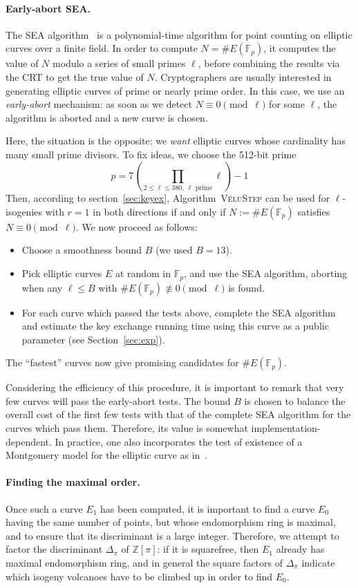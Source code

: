 \documentclass{llncs}
\newcommand{\F}{\mathbb{F}}
\newcommand{\Z}{\mathbb{Z}}
\newcommand{\algstyle}[1]{\textsc{#1}}
\begin{document}
\paragraph{Early-abort SEA.}
The SEA algorithm~\cite{schoof95,Morain95}
is a polynomial-time algorithm for
point counting on elliptic curves over a finite field. In order to compute
$N = \# E(\F_p)$, it computes the value of $N$ modulo a series
of small primes $\ell$, before combining the results via the CRT
to get the true value of $N$.
Cryptographers are usually interested in generating elliptic curves of
prime or nearly prime order. In this case, we use an \emph{early-abort}
mechanism: as soon as we detect $N \equiv 0\pmod{\ell}$ for some $\ell$, the algorithm is aborted
and a new curve is chosen.

Here, the situation is the opposite: we \emph{want} elliptic curves
whose cardinality has many small prime divisors.
To fix ideas, we choose the 512-bit prime
\[
    p = 7 \left(\prod_{2\leq\ell\leq 380,\ \ell \text{ prime}} \ell\right) - 1
\]
Then, according to section~\ref{sec:keyex}, Algorithm~\algstyle{VéluStep} can be used
for $\ell$-isogenies with $r=1$ in both directions if and only if
$N := \# E(\F_p)$ satisfies $N \equiv0\pmod{\ell}$.
We now proceed as follows:
\begin{itemize}
\item Choose a smoothness bound $B$ (we used $B = 13$).
\item Pick elliptic curves $E$ at random in $\F_p$, and use the SEA algorithm,
aborting when any $\ell\leq B$ 
with $\#E(\F_p) \not\equiv 0\pmod{\ell}$ is found.
\item For each curve which passed the tests above, complete the SEA
algorithm and estimate the key exchange running time using this
curve as a public parameter (see Section~\ref{sec:exp}).
\end{itemize}
The ``fastest'' curves now give promising candidates for $\#E(\F_p)$.

Considering the efficiency of this procedure, it is important to remark
that very few curves will pass the early-abort tests. The bound $B$ is
chosen to balance the overall cost of the first few tests with that of
the complete SEA algorithm for the curves which pass them. Therefore,
its value is somewhat implementation-dependent. In practice, one also
incorporates the test of existence of a Montgomery model for the
elliptic curve as in~\cite{OKS00}.

\paragraph{Finding the maximal order.}
Once such a curve $E_1$ has been computed, it is important to find a curve
$E_0$ having the same number of points, but whose endomorphism ring is maximal, and
to ensure that its discriminant is a large integer. Therefore, we attempt to
factor the discriminant $Δ_\pi$ of $\Z[\pi]$: if it is squarefree,
then $E_1$ already has maximal endomorphism ring, and in general the square
factors of $Δ_\pi$ indicate which isogeny volcanoes have to be climbed up
in order to find $E_0$.
\end{document}
